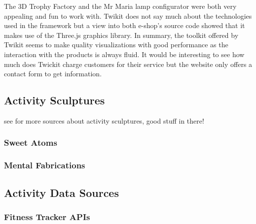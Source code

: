\documentclass[../medieninformatik-arbeit.tex]{subfiles}
\begin{document}
The 3D Trophy Factory and the Mr Maria lamp configurator were both very appealing and fun to work with. Twikit does not say much about the technologies used in the framework but a view into both e-shop's source code showed that it makes use of the Three.js\cite{cabello2010three} graphics library. In summary, the toolkit offered by Twikit seems to make quality visualizations with good performance as the interaction with the products is always fluid. It would be interesting to see how much does Twickit charge customers for their service but the website only offers a contact form to get information.    

\subsection{Activity Sculptures}
see \cite{swaminathan2014supporting} for more sources about activity sculptures, good stuff in there!

\subsubsection{Sweet Atoms}

\subsubsection{Mental Fabrications}

\subsection{Activity Data Sources}

\subsubsection{Fitness Tracker APIs}
\end{document}
